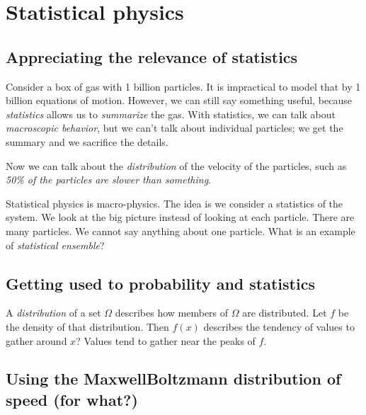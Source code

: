 \chapter{Statistical physics}

\section{Appreciating the relevance of statistics}

Consider a box of gas with 1 billion particles.
It is impractical to model that by 1 billion equations of motion.
However, we can still say something useful,
because \emph{statistics} allows us to \emph{summarize} the gas.
With statistics, we can talk about \emph{macroscopic behavior},
but we can't talk about individual particles;
we get the summary and we sacrifice the details.

Now we can talk about the \emph{distribution} of the velocity of the particles,
such as \emph{50\% of the particles are slower than something}.

Statistical physics is macro-physics.
The idea is we consider a statistics of the system.
We look at the big picture instead of looking at each particle.
There are many particles.
We cannot say anything about one particle.
What is an example of \emph{statistical ensemble}?

\section{Getting used to probability and statistics}


\ShowAnswers

A \emph{distribution} of a set \(\Omega\) describes how members of \(\Omega\) are distributed.
Let \(f\) be the density of that distribution.
Then \(f(x)\) describes the tendency of values to gather around \(x\)?
Values tend to gather near the peaks of \(f\).

\section{Using the Maxwell\textendash{}Boltzmann distribution of speed (for what?)}

